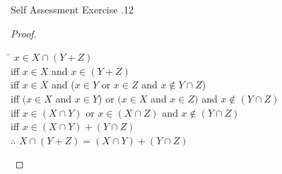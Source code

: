 \documentclass[\main/notes.tex]{subfiles}
\begin{document}
\begin{exercise}{Self Assessment Exercise \thechapter.12}
\begin{questions}
\begin{questions}[first=\bfseries]
\begin{answer}
\begin{proof}
										\begin{tabbing}
											\qquad \= $x \in X \cap (Y + Z)$\\
											iff \> $x \in X$ and $x \in (Y + Z)$\\
											iff \> $x \in X$ and ($x \in Y$ or $x \in Z$ and $x \notin Y \cap Z$)\\
											iff \> $(x \in X$ and $x \in Y$) or $(x \in X$ and $x \in Z)$ and $x \notin (Y \cap Z)$\\
											iff \> $x \in (X \cap Y)$ or $x \in (X \cap Z)$ and $x \notin (Y \cap Z)$\\
											iff \> $x \in (X \cap Y) + (Y \cap Z)$\\
											$\therefore$ \> $X \cap (Y + Z) = (X \cap Y) + (Y \cap Z)$
										\end{tabbing}
									\end{proof}
								\end{answer}
						\end{questions}
				\end{questions}
			\end{exercise}
\end{document}
